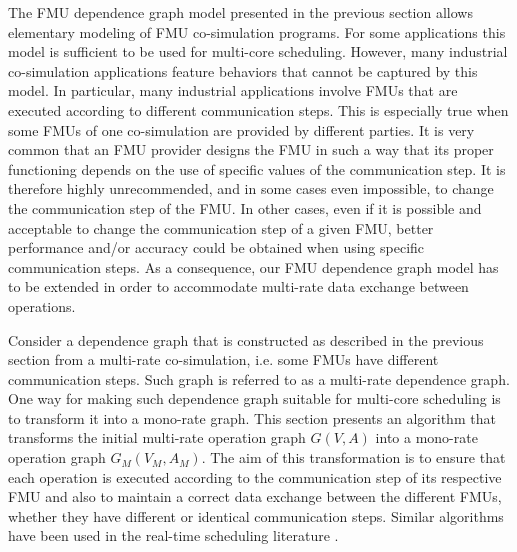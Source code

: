 The FMU dependence graph model presented in the previous section allows elementary modeling of FMU co-simulation programs. For some applications this model is sufficient to be used for multi-core scheduling. However, many industrial co-simulation applications feature behaviors that cannot be captured by this model. In particular, many industrial applications involve FMUs that are executed according to different communication steps. This is especially true when some FMUs of one co-simulation are provided by different parties. It is very common that an FMU provider designs the FMU in such a way that its proper functioning depends on the use of specific values of the communication step. It is therefore highly unrecommended, and in some cases even impossible, to change the communication step of the FMU. In other cases, even if it is possible and acceptable to change the communication step of a given FMU, better performance and/or accuracy could be obtained when using specific communication steps. As a consequence, our FMU dependence graph model has to be extended in order to accommodate multi-rate data exchange between operations. 

Consider a dependence graph that is constructed as described in the previous section from a multi-rate co-simulation, i.e. some FMUs have different communication steps. Such graph is referred to as a multi-rate dependence graph. One way for making such dependence graph suitable for multi-core scheduling is to transform it into a mono-rate graph. This section presents an algorithm that transforms the initial multi-rate operation graph $G(V,A)$ into a mono-rate operation graph $G_M(V_M,A_M)$. The aim of this transformation is to ensure that each operation is executed according to the communication step of its respective FMU and also to maintain a correct data exchange between the different FMUs, whether they have different or identical communication steps. Similar algorithms have been used in the real-time scheduling literature \cite{kermia:2009, ramamritham:1995}.

